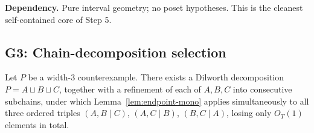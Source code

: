 \noindent\textbf{Dependency.} Pure interval geometry; no poset hypotheses.
This is the cleanest self-contained core of Step 5.

\subsection{G3: Chain-decomposition selection}

\begin{lemma}\label{lem:decomp-selection}
Let $P$ be a width-3 counterexample. There exists a Dilworth decomposition
$P = A \sqcup B \sqcup C$, together with a refinement of each of
$A, B, C$ into consecutive subchains, under which
Lemma~\ref{lem:endpoint-mono} applies simultaneously to all three
ordered triples $(A,B \mid C)$, $(A,C \mid B)$, $(B,C \mid A)$, losing
only $O_T(1)$ elements in total.
\end{lemma}

